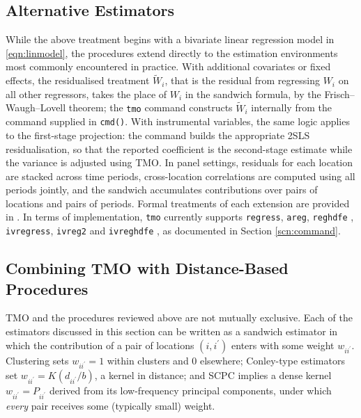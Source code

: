\documentclass[varwidth,bib]{statapress}
\begin{document}
\subsection{Alternative Estimators}
While the above treatment begins with a bivariate linear regression model in \eqref{eqn:linmodel}, the procedures extend directly to the estimation environments most commonly encountered in practice.  With additional covariates or fixed effects, the residualised treatment $\tilde{W}_i$, that is the residual from regressing $W_i$ on all other regressors, takes the place of $W_i$ in the sandwich formula, by the Frisch--Waugh--Lovell theorem; the {\tt tmo} command constructs $\tilde{W}_i$ internally from the command supplied in {\tt cmd()}.  With instrumental variables, the same logic applies to the first-stage projection: the command builds the appropriate 2SLS residualisation, so that the reported coefficient is the second-stage estimate while the variance is adjusted using TMO.  In panel settings, residuals for each location are stacked across time periods, cross-location correlations are computed using all periods jointly, and the sandwich accumulates contributions over pairs of locations and pairs of periods.  Formal treatments of each extension are provided in \citet[Appendix B.3]{Dellavignaetal2025}.  In terms of implementation, {\tt tmo} currently supports {\tt regress}, {\tt areg}, {\tt reghdfe} \citep{Correia2014reghdfe}, {\tt ivregress}, {\tt ivreg2} \citep{Baumetal2002ivreg2} and {\tt ivreghdfe} \citep{Correia2018ivreghdfe}, as documented in Section \ref{scn:command}.

\subsection{Combining TMO with Distance-Based Procedures}
\label{sscn:combining}
TMO and the procedures reviewed above are not mutually exclusive.  Each of the estimators discussed in this section can be written as a sandwich estimator in which the contribution of a pair of locations $(i,i^\prime)$ enters with some weight $w_{ii^\prime}$.  Clustering sets $w_{ii^\prime}=1$ within clusters and $0$ elsewhere; Conley-type estimators set $w_{ii^\prime}=K(d_{ii^\prime}/b)$, a kernel in distance; and SCPC implies a dense kernel $w_{ii^\prime}=P_{ii^\prime}$ derived from its low-frequency principal components, under which \textit{every} pair receives some (typically small) weight.
\end{document}
